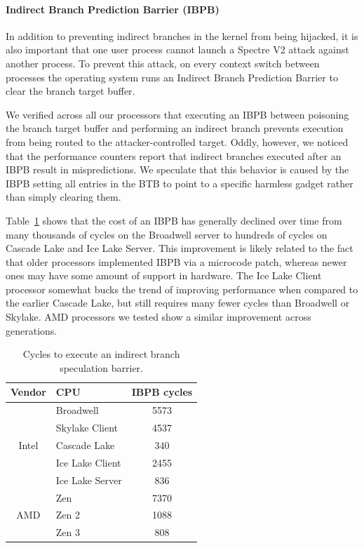 \paragraph{Indirect Branch Prediction Barrier (IBPB)}

In addition to preventing indirect branches in the kernel from being
hijacked, it is also important that one user process cannot launch a Spectre V2 attack against another process.
To prevent this attack, on every context switch between processes the operating system runs an Indirect Branch Prediction Barrier to clear the branch target buffer.

We verified across all our processors that executing an IBPB between poisoning the branch target buffer and performing an indirect branch prevents execution from being routed to the attacker-controlled target.
Oddly, however, we noticed that the performance counters report that indirect branches executed after an IBPB result in mispredictions.
We speculate that this behavior is caused by the IBPB setting all entries in the BTB to point to a specific harmless gadget rather than simply clearing them.

Table~\ref{table:ibpb} shows that the cost of an IBPB has generally
declined over time from many thousands of cycles on the Broadwell
server to hundreds of cycles on Cascade Lake and Ice Lake Server.
This improvement is likely related to the fact that older processors implemented IBPB via a microcode patch, whereas newer ones may have some amount of support in hardware.
The Ice Lake Client processor somewhat bucks the trend of improving performance when compared to the earlier Cascade Lake, but still requires many fewer cycles than Broadwell or Skylake.
AMD processors we tested show a similar improvement across generations.

\begin{table}[h]
    \begin{center}
    \begin{tabular}{ clc }
      \textbf{Vendor} & \textbf{CPU} & \textbf{IBPB cycles} \\ \hline

      \multirow{5}{*}{Intel} & Broadwell         & 5573 \\
                             & Skylake Client    & 4537 \\
                             & Cascade Lake      & 340 \\
                             & Ice Lake Client   & 2455 \\
                             & Ice Lake Server   & 836 \\ \hline
      \multirow{3}{*}{AMD}   & Zen               & 7370 \\
                             & Zen 2             & 1088 \\
                             & Zen 3             & 808 \\ \hline
    \end{tabular}
    \end{center}
    \caption{Cycles to execute an indirect branch speculation barrier. }
    \label{table:ibpb}
\end{table}

